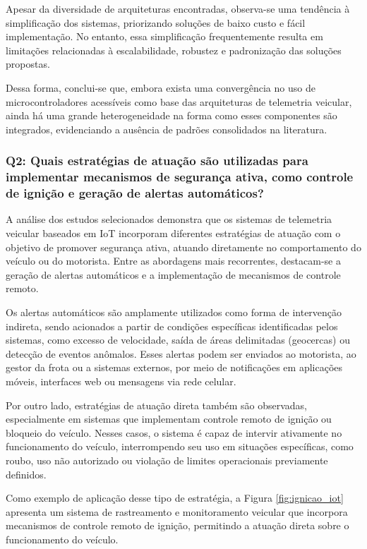 \documentclass[
	article,			%
	11pt,				%
	oneside,			%
	a4paper,			%
	english,			%
	brazil,				%
	sumario=tradicional
	]{abntex2}
\begin{document}
Apesar da diversidade de arquiteturas encontradas, observa-se uma tendência à simplificação dos sistemas, priorizando soluções de baixo custo e fácil implementação. No entanto, essa simplificação frequentemente resulta em limitações relacionadas à escalabilidade, robustez e padronização das soluções propostas.

Dessa forma, conclui-se que, embora exista uma convergência no uso de microcontroladores acessíveis como base das arquiteturas de telemetria veicular, ainda há uma grande heterogeneidade na forma como esses componentes são integrados, evidenciando a ausência de padrões consolidados na literatura.

\subsubsection{Q2: Quais estratégias de atuação são utilizadas para implementar mecanismos de segurança ativa, como controle de ignição e geração de alertas automáticos?}

A análise dos estudos selecionados demonstra que os sistemas de telemetria veicular baseados em IoT incorporam diferentes estratégias de atuação com o objetivo de promover segurança ativa, atuando diretamente no comportamento do veículo ou do motorista. Entre as abordagens mais recorrentes, destacam-se a geração de alertas automáticos e a implementação de mecanismos de controle remoto.

Os alertas automáticos são amplamente utilizados como forma de intervenção indireta, sendo acionados a partir de condições específicas identificadas pelos sistemas, como excesso de velocidade, saída de áreas delimitadas (geocercas) ou detecção de eventos anômalos. Esses alertas podem ser enviados ao motorista, ao gestor da frota ou a sistemas externos, por meio de notificações em aplicações móveis, interfaces web ou mensagens via rede celular.

Por outro lado, estratégias de atuação direta também são observadas, especialmente em sistemas que implementam controle remoto de ignição ou bloqueio do veículo. Nesses casos, o sistema é capaz de intervir ativamente no funcionamento do veículo, interrompendo seu uso em situações específicas, como roubo, uso não autorizado ou violação de limites operacionais previamente definidos.

Como exemplo de aplicação desse tipo de estratégia, a Figura \ref{fig:ignicao_iot} apresenta um sistema de rastreamento e monitoramento veicular que incorpora mecanismos de controle remoto de ignição, permitindo a atuação direta sobre o funcionamento do veículo.
\end{document}
